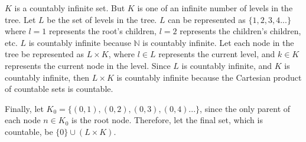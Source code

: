 \documentclass[letterpaper,notitlepage,twoside]{article}
\newcommand{\N}{\mathbb{N}} %
\begin{document}
$K$ is a countably infinite set. But $K$ is one of an infinite number of levels in the tree. Let $L$ be the set of levels in the tree.
$L$ can be represented as $\{1, 2, 3, 4...\}$ where $l = 1$ represents the root's children, $l = 2$ represents the children's children, etc.
$L$ is countably infinite because $\N$ is countably infinite.
Let each node in the tree be represented as $L \times K$, where $l \in L$ represents the current level, and $k \in K$ represents the current node in the level. Since $L$ is countably infinite, and $K$ is countably infinite, then $L \times K$ is countably infinite because the Cartesian product of countable sets is countable.

Finally, let $K_0 = \{(0,1), (0,2), (0,3), (0,4)...\}$, since the only parent of each node $n \in K_0$ is the root node. Therefore, let the final set, which is countable, be $\{0\} \cup (L \times K)$.
\end{document}
